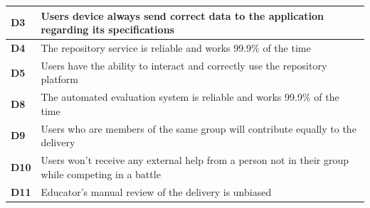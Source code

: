 \documentclass[../RASD.tex]{subfiles}
\begin{document}
\begin{table}[h!]
\begin{center}
\begin{tabular}{|m{2em}|m{30em}|}
                \textbf{D3} & Users device always send correct data to the application regarding its specifications\\
                \hline
                \cellcolor{ReqMappingCell3}
                \textbf{D4} & The repository service is reliable and works 99.9\% of the time\\
                \hline
                \cellcolor{ReqMappingCell3}
                \textbf{D5} & Users have the ability to interact and correctly use the repository platform\\
                \hline
                \cellcolor{ReqMappingCell3}
                \textbf{D8} & The automated evaluation system is reliable and works 99.9\% of the time\\
                \hline
                \cellcolor{ReqMappingCell3}
                \textbf{D9} & Users who are members of the same group will contribute equally to the delivery\\
                \hline
                \cellcolor{ReqMappingCell3}
                \textbf{D10} & Users won't receive any external help from a person not in their group while competing in a battle\\
                \hline
                \cellcolor{ReqMappingCell3}
                \textbf{D11} & Educator's manual review of the delivery is unbiased\\
                \hline
                \end{tabular}
            \end{center}
        \end{table}\newpage

\end{document}

